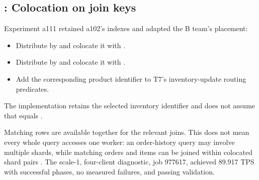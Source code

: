 \subsection{: Colocation on join keys}
Experiment a111 retained a102's indexes and adapted the B team's placement:
\begin{itemize}
\item Distribute  by  and colocate it with
.
\item Distribute  by  and colocate it with
.
\item Add the corresponding product identifier to T7's inventory-update
routing predicates.
\end{itemize}
The implementation retains the selected inventory identifier and does not
assume that  equals .

Matching rows are available together for the relevant joins. This does not
mean every whole query accesses one worker: an order-history query may involve
multiple shards, while matching orders and items can be joined within colocated
shard pairs \citep{citus-distribution}. The scale-1, four-client diagnostic,
job 977617, achieved 89.917 TPS with successful phases, no measured failures,
and passing validation.
